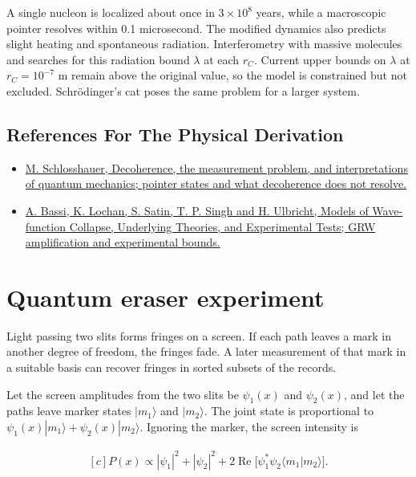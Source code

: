 \documentclass[11pt,oneside]{book}
\newenvironment{centeredalign}{\[\begin{gathered}[c]}{\end{gathered}\]}
\begin{document}
A single nucleon is localized about once in \(3\times10^8\) years, while a macroscopic pointer resolves within 0.1 microsecond. The modified dynamics also predicts slight heating and spontaneous radiation. Interferometry with massive molecules and searches for this radiation bound \(\lambda\) at each \(r_C\). Current upper bounds on \(\lambda\) at \(r_C=10^{-7}\) m remain above the original value, so the model is constrained but not excluded. Schrödinger's cat poses the same problem for a larger system.

\subsection*{References For The Physical Derivation}
\begin{itemize}
\item \href{https://arxiv.org/abs/quant-ph/0312059}{M. Schlosshauer, Decoherence, the measurement problem, and interpretations of quantum mechanics; pointer states and what decoherence does not resolve.}
\item \href{https://arxiv.org/abs/1204.4325}{A. Bassi, K. Lochan, S. Satin, T. P. Singh and H. Ulbricht, Models of Wave-function Collapse, Underlying Theories, and Experimental Tests; GRW amplification and experimental bounds.}
\end{itemize}





\clearpage

\section{Quantum eraser experiment}

\label{topic:quantum-eraser-experiment}

Light passing two slits forms fringes on a screen. If each path leaves a mark in another degree of freedom, the fringes fade. A later measurement of that mark in a suitable basis can recover fringes in sorted subsets of the records.

Let the screen amplitudes from the two slits be \(\psi_1(x)\) and \(\psi_2(x)\), and let the paths leave marker states \(|m_1\rangle\) and \(|m_2\rangle\). The joint state is proportional to \(\psi_1(x)|m_1\rangle+\psi_2(x)|m_2\rangle\). Ignoring the marker, the screen intensity is

\begin{centeredalign}
P(x)\propto|\psi_1|^2+|\psi_2|^2+2\operatorname{Re}\big[\psi_1^*\psi_2\langle m_1|m_2\rangle\big].
\end{centeredalign}
\end{document}

